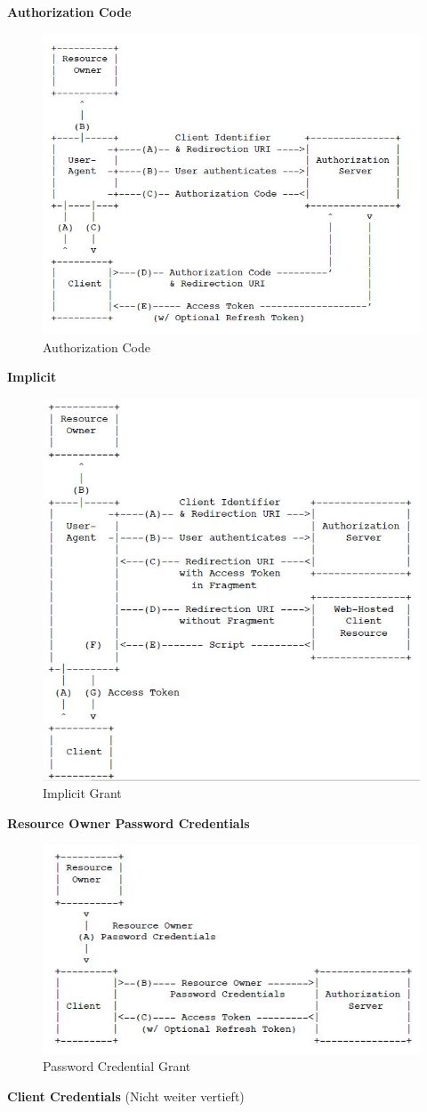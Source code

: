 \textbf{Authorization Code}
\begin{figure}[h!]
\centering
\includegraphics[width=0.7\linewidth]{fig/authorization-code}
\caption{Authorization Code}
\label{fig:authorization-code}
\end{figure}

\newpage
\textbf{Implicit}
\begin{figure}[h!]
	\centering
	\includegraphics[width=0.7\linewidth]{fig/implicit-grant}
	\caption{Implicit Grant}
	\label{fig:implicit-grant}
\end{figure}

\textbf{Resource Owner Password Credentials}
\begin{figure}[h!]
	\centering
	\includegraphics[width=0.7\linewidth]{fig/password-credential-grant}
	\caption{Password Credential Grant}
	\label{fig:password-credential-grant}
\end{figure}

\textbf{Client Credentials} (Nicht weiter vertieft)

